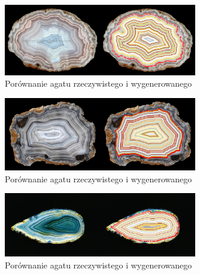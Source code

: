 \documentclass{article}
\begin{document}
\begin{figure}[H]
\caption{Porównanie agatu rzeczywistego i wygenerowanego}
\label{comparison3}
\centering
\includegraphics[width=0.75\textwidth]{obrazy/comparison/3.png}
\end{figure}
\begin{figure}[H]
\caption{Porównanie agatu rzeczywistego i wygenerowanego}
\label{comparison4}
\centering
\includegraphics[width=0.75\textwidth]{obrazy/comparison/4.png}
\end{figure}
\begin{figure}[H]
\caption{Porównanie agatu rzeczywistego i wygenerowanego}
\label{comparison5}
\centering
\includegraphics[width=0.75\textwidth]{obrazy/comparison/5.png}
\end{figure}
\end{document}
